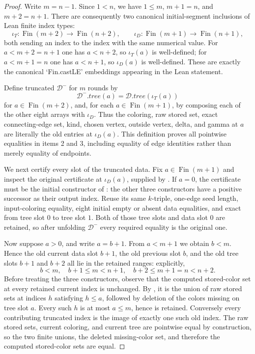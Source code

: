 \begin{proof}
Write $m=n-1$.  Since $1<n$, we have $1\leq m$, $m+1=n$, and
$m+2=n+1$.  There are consequently two canonical initial-segment
inclusions of Lean finite index types:
\[
 \iota_T:\operatorname{Fin}(m+2)\longrightarrow
             \operatorname{Fin}(n+2),\qquad
 \iota_D:\operatorname{Fin}(m+1)\longrightarrow
             \operatorname{Fin}(n+1),
\]
both sending an index to the index with the same numerical value.  For
$a<m+2=n+1$ one has $a<n+2$, so $\iota_T(a)$ is well-defined; for
$a<m+1=n$ one has $a<n+1$, so $\iota_D(a)$ is well-defined.  These are
exactly the canonical `Fin.castLE' embeddings appearing in the Lean
statement.

Define truncated  $\mathcal D^-$ for $m$
rounds by
\[
 \mathcal D^-.\mathit{tree}(a)=\mathcal D.\mathit{tree}(\iota_T(a))
\]
for $a\in\operatorname{Fin}(m+2)$, and, for each
$a\in\operatorname{Fin}(m+1)$, by composing each of the other eight
arrays with $\iota_D$.  Thus the coloring, raw stored set, exact
connecting-edge set, kind, chosen vertex, outside vertex, delta, and
gamma at $a$ are literally the old entries at $\iota_D(a)$.  This
definition proves all pointwise equalities in items 2 and 3, including
equality of edge identities rather than merely equality of endpoints.

We next certify every slot of the truncated data.  Fix
$a\in\operatorname{Fin}(m+1)$ and inspect the original certificate at
$\iota_D(a)$, supplied by .  If $a=0$, the
certificate must be the initial constructor of
: the other three constructors have a
positive successor as their output index.  Reuse its same $k$-triple,
one-edge seed length, input-coloring equality, eight initial empty or
absent data equalities, and exact  from tree
slot $0$ to tree slot $1$.  Both of those tree slots and data slot $0$
are retained, so after unfolding $\mathcal D^-$ every required equality
is the original one.

Now suppose $a>0$, and write $a=b+1$.  From $a<m+1$ we obtain
$b<m$.  Hence the old current data slot $b+1$, the old previous slot
$b$, and the old tree slots $b+1$ and $b+2$ all lie in the retained
ranges: explicitly,
\[
 b<m,\quad b+1\leq m<n+1,
 \quad b+2\leq m+1=n<n+2.                 \tag{1}
\]
Before treating the three constructors, observe that the computed
stored-color set at every retained current index is unchanged.  By
, it is the union of raw stored sets at
indices $h$ satisfying $h\leq a$, followed by deletion of the colors
missing on tree slot $a$.  Every such $h$ is at most $a\leq m$, hence
is retained.  Conversely every contributing truncated index is the
image of exactly one such old index.  The raw stored sets, current
coloring, and current tree are pointwise equal by construction, so the
two finite unions, the deleted missing-color set, and therefore the
computed stored-color sets are equal.                              


\end{proof}
